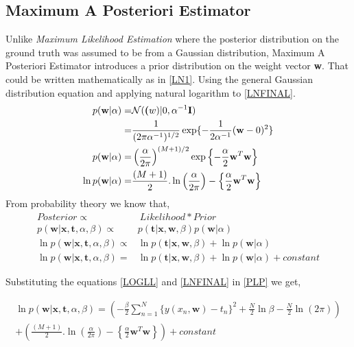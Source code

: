 \documentclass[12pt,twoside,a4paper]{article}
\begin{document}
\pagebreak
\subsection{Maximum A Posteriori Estimator}
Unlike \textit{Maximum Likelihood Estimation} where the posterior distribution on the ground truth was assumed to be from a Gaussian distribution, Maximum A Posteriori Estimator introduces a prior distribution on the weight vector \textbf{w}. That could be written mathematically as in \eqref{LN1}. Using the general Gaussian distribution equation and applying natural logarithm to \eqref{LNFINAL}.
\begin{align}
p(\textbf{w}|\alpha) =& \mathcal{N}(\textbf(w)|0,\alpha^{-1}\textbf{I}) \label{LN1}\\
=& \frac{1}{(2\pi\alpha^{-1})^{1/2}}\exp\{-\frac{1}{2\alpha^{-1}}(\textbf{w}-0)^2\} \\
p(\textbf{w}|\alpha) =& \left( \frac{\alpha}{2\pi}\right)^{(M+1)/2} \exp\left\{ -\frac{\alpha}{2}\textbf{w}^T\textbf{w}\right\} \\
\ln p(\textbf{w}|\alpha) =& \frac{(M+1)}{2}.\ln\left( \frac{\alpha}{2\pi}\right) - \left\{ \frac{\alpha}{2}\textbf{w}^T\textbf{w}\right\} \label{LNFINAL}
\end{align}
From probability theory we know that,
\begin{align}
Posterior \propto& \ Likelihood * Prior\\
    p(\textbf{w}|\textbf{x},\textbf{t},\alpha,\beta) \propto& p(\textbf{t}|\textbf{x},\textbf{w},\beta) p(\textbf{w}|\alpha) \\
    \ln p(\textbf{w}|\textbf{x},\textbf{t},\alpha,\beta) \propto& \ln p(\textbf{t}|\textbf{x},\textbf{w},\beta) + \ln p(\textbf{w}|\alpha) \\
    \ln p(\textbf{w}|\textbf{x},\textbf{t},\alpha,\beta) =& \ln p(\textbf{t}|\textbf{x},\textbf{w},\beta) + \ln p(\textbf{w}|\alpha) + constant \label{PLP}
\end{align}

Substituting the equations \eqref{LOGLL} and \eqref{LNFINAL} in \eqref{PLP} we get,

\begin{multline}
        \ln p(\textbf{w}|\textbf{x},\textbf{t},\alpha,\beta) = {\left( -\frac{\beta}{2}\sum_{n=1}^{N} {\{y(x_n,\textbf{w})-t_n\}^2} + \frac{N}{2}\ln\beta - \frac{N}{2}\ln(2\pi) \right )} \\ + \left ( \frac{(M+1)}{2}.\ln\left( \frac{\alpha}{2\pi}\right) - \left\{ \frac{\alpha}{2}\textbf{w}^T\textbf{w}\right\} \right ) + constant
\end{multline}
\end{document}
